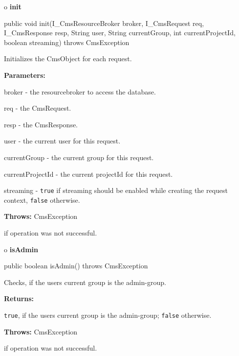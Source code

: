 o {\bf init} 

\begin{PRE}
 public void init(I\_CmsResourceBroker broker,
                  I\_CmsRequest req,
                  I\_CmsResponse resp,
                  String user,
                  String currentGroup,
                  int currentProjectId,
                  boolean streaming) throws CmsException
\end{PRE}

\begin{description}
\htmlDD Initializes the CmsObject for each request. 

\begin{description}
\item {\bf Parameters:}  

broker - the resourcebroker to access the database.  

req - the CmsRequest.  

resp - the CmsResponse.  

user - the current user for this request.  

currentGroup - the current group for this request.  

currentProjectId - the current projectId for this request.  

streaming - {\tt true} if streaming should be enabled while creating the
request context, {\tt false} otherwise.  
\item {\bf Throws:} CmsException  

if operation was not successful.  
\end{description}

\end{description}

o {\bf isAdmin} 

\begin{PRE}
 public boolean isAdmin() throws CmsException
\end{PRE}

\begin{description}
\htmlDD Checks, if the users current group is the admin-group. 

\begin{description}
\item {\bf Returns:}  

{\tt true}, if the users current group is the admin-group; {\tt false}
otherwise.  
\item {\bf Throws:} CmsException  

if operation was not successful.  
\end{description}

\end{description}

